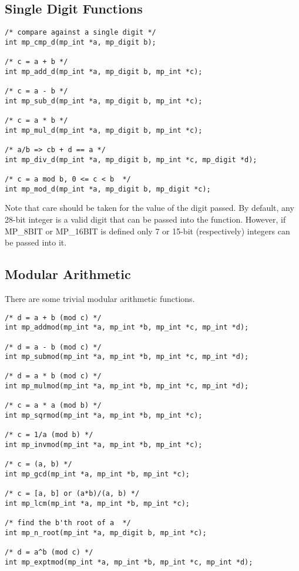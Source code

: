\documentclass{article}
\begin{document}
\subsection{Single Digit Functions}

\begin{verbatim}
/* compare against a single digit */
int mp_cmp_d(mp_int *a, mp_digit b);

/* c = a + b */
int mp_add_d(mp_int *a, mp_digit b, mp_int *c);

/* c = a - b */
int mp_sub_d(mp_int *a, mp_digit b, mp_int *c);

/* c = a * b */
int mp_mul_d(mp_int *a, mp_digit b, mp_int *c);

/* a/b => cb + d == a */
int mp_div_d(mp_int *a, mp_digit b, mp_int *c, mp_digit *d);

/* c = a mod b, 0 <= c < b  */
int mp_mod_d(mp_int *a, mp_digit b, mp_digit *c);
\end{verbatim}

Note that care should be taken for the value of the digit passed.  By default, any 28-bit integer is a valid digit that can
be passed into the function.  However, if MP\_8BIT or MP\_16BIT is defined only 7 or 15-bit (respectively) integers 
can be passed into it.

\subsection{Modular Arithmetic}

There are some trivial modular arithmetic functions.

\begin{verbatim}
/* d = a + b (mod c) */
int mp_addmod(mp_int *a, mp_int *b, mp_int *c, mp_int *d);

/* d = a - b (mod c) */
int mp_submod(mp_int *a, mp_int *b, mp_int *c, mp_int *d);

/* d = a * b (mod c) */
int mp_mulmod(mp_int *a, mp_int *b, mp_int *c, mp_int *d);

/* c = a * a (mod b) */
int mp_sqrmod(mp_int *a, mp_int *b, mp_int *c);

/* c = 1/a (mod b) */
int mp_invmod(mp_int *a, mp_int *b, mp_int *c);

/* c = (a, b) */
int mp_gcd(mp_int *a, mp_int *b, mp_int *c);

/* c = [a, b] or (a*b)/(a, b) */
int mp_lcm(mp_int *a, mp_int *b, mp_int *c);

/* find the b'th root of a  */
int mp_n_root(mp_int *a, mp_digit b, mp_int *c);

/* d = a^b (mod c) */
int mp_exptmod(mp_int *a, mp_int *b, mp_int *c, mp_int *d);
\end{verbatim}
\end{document}
